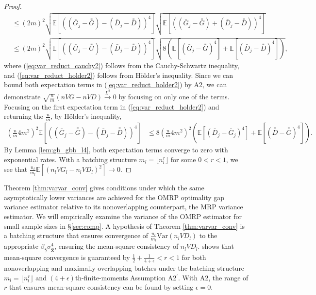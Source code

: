 \documentclass[12pt]{article}
\newcommand{\e}[1]{\mathbb{E} \left[ #1 \right]
}
\newcommand{\var}[1]{\mathrm{Var} \left( #1 \right)}
\newcommand{\x}{\mathbf{x}}
\newcommand{\xh}{{\hat{\x}}}
\newcommand{\gammab}{\bar{\gamma}}
\newcommand{\gb}{\bar{G}}
\newcommand{\gbb}{\bar{\gb}}
\newcommand{\db}{\bar{D}}
\newcommand{\dbb}{\bar{\db}}
\begin{document}
\begin{proof}
\begin{align}
		& \leq \left( 2m \right)^2 \sqrt{\e{\left((\gb_j - \gbb) - (\db_j - \dbb)\right)^4}} \sqrt{\e{\left((\gb_j - \gbb) + (\db_j - \dbb)\right)^4 }} \label{eq:var_reduct_cauchy2} \\
		& \leq \left( 2m \right)^2 \sqrt{\e{\left((\gb_j - \gbb) - (\db_j - \dbb)\right)^4}} \sqrt{8 \left(\e{(\gb_j - \gbb)^4} + \e{(\db_j - \dbb)^4} \right)}, \label{eq:var_reduct_holder2}
	\end{align}
	where (\ref{eq:var_reduct_cauchy2}) follows from the Cauchy-Schwartz inequality, and (\ref{eq:var_reduct_holder2}) follows from H\"{o}lder's inequality.  
        Since we can bound both expectation terms in (\ref{eq:var_reduct_holder2}) by A2, we can demonstrate $\sqrt{\frac{n}{m}}(nVG - nVD) \xrightarrow{L^2} 0$ by focusing on only one of the terms.  
        Focusing on the first expectation term in (\ref{eq:var_reduct_holder2}) and returning the $\tfrac{n}{m}$, by H\"{o}lder's inequality,
	\begin{align*}
		\left(\frac{n}{m} 4m^2\right)^2 \e{\left((\gb_j - \gbb) - (\db_j - \dbb)\right)^4}	& \leq 8 \left( \frac{n}{m} 4m^2\right)^2 \left( \e{(\db_j - \gb_j)^4} + \e{(\dbb - \gbb)^4} \right).
	\end{align*}	
	By Lemma \ref{lem:gb_gbb_l4}, both expectation terms converge to zero with exponential rates.  
        With a batching structure $m_l = \lfloor n_l^r \rfloor$ for some $0<r<1$, we see that $\frac{n_l}{m_l} \e{(n_l VG_l - n_l VD_l)^2} \rightarrow 0$.
\end{proof} 


Theorem \ref{thm:varvar_conv} gives conditions under which the same asymptotically lower variances are achieved for the OMRP optimality gap variance estimator relative to its nonoverlapping counterpart, the MRP variance estimator. 
We will empirically examine the variance of the OMRP estimator for small sample sizes in \S \ref{sec:comp}. 
A hypothesis of Theorem \ref{thm:varvar_conv} is a batching structure that ensures convergence of $\frac{n_l}{m_l}\var{n_l VD_l}$ to the appropriate $\beta_{\gammab} \sigma^4_{\xh}$, ensuring the mean-square consistency of $n_l VD_l$. 
\citet{damerdji1995mean} shows that mean-square convergence is guaranteed by $\tfrac{1}{2} + \tfrac{1}{4+\epsilon} < r < 1$ for both nonoverlapping and maximally overlapping batches under the batching structure $m_l = \lfloor n_l^r \rfloor$ and $(4+\epsilon)$th-finite-moments Assumption A2$^\prime$.  
With A2, the range of $r$ that ensures mean-square consistency can be found by setting $\epsilon=0$.
\end{document}
